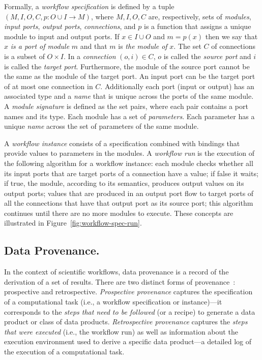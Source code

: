 \documentclass[12pt]{iopart}
\newcommand{\ie}{i.e.,\xspace}
\begin{document}
Formally, a \emph{workflow specification} is defined by a tuple
$(M,I,O,C,p:O \cup I \rightarrow M)$, where $M, I, O, C$ are,
respectively, sets of {\it modules}, {\it input ports}, {\it output
  ports}, {\it connections}, and $p$ is a function that assigns a
unique module to input and output ports.  If $x \in I \cup O$ and $m =
p(x)$ then we say that $x$ {\it is a port of module} $m$ and that $m$
is {\it the module of} $x$.  The set $C$ of connections is a subset of
$O \times I$.  In a {\it connection} $(o,i) \in C$, $o$ is called the
{\it source port} and $i$ is called the {\it target
  port}. Furthermore, the module of the source port cannot be the same
as the module of the target port.  An input port can be the target
port of at most one connection in $C$.  Additionally each port (input
or output) has an associated type and a {\it name} that is unique
across the ports of the same module.  A {\it module signature} is
defined as the set pairs, where each pair contains a port names and
its type.  Each module has a set of {\it parameters}.  Each parameter
has a unique {\it name} across the set of parameters of the same
module.

A \emph{workflow instance} consists of a specification combined with
bindings that provide values to parameters in the modules.  A {\it
  workflow run} is the execution of the following algorithm for a
workflow instance: each module checks whether all its input ports that
are target ports of a connection have a value; if false it waits; if
true, the module, according to its semantics, produces output values
on its output ports; values that are produced in an output port flow
to target ports of all the connections that have that output port as
its source port; this algorithm continues until there are no more
modules to execute.
%
These concepts are illustrated in Figure~\ref{fig:workflow-spec-run}.

\subsection{Data Provenance.}
In the context of scientific workflows, data provenance is a record of
the derivation of a set of results.  There are two distinct forms of
provenance~\cite{VDL:Challenge06}: prospective and retrospective.
\emph{Prospective provenance} captures the specification of a
computational task (\ie a workflow specification or instance)---it
corresponds to the \emph{steps that need to be followed} (or a recipe)
to generate a data product or class of data products.
\emph{Retrospective provenance} captures the \emph{steps that were
  executed} (\ie the workflow run) as well as information about the
execution environment used to derive a specific data product---a
detailed log of the execution of a computational task.
\end{document}
